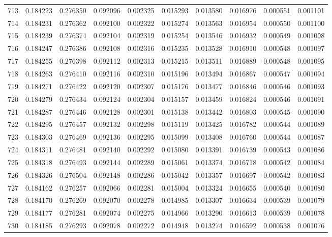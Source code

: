 \begin{tabular}{lrrrrrrrrr}
713 & 0.184223 & 0.276350 & 0.092096 & 0.002325 & 0.015293 & 0.013580 & 0.016976 & 0.000551 & 0.001101 \\
714 & 0.184231 & 0.276362 & 0.092100 & 0.002322 & 0.015274 & 0.013563 & 0.016954 & 0.000550 & 0.001100 \\
715 & 0.184239 & 0.276374 & 0.092104 & 0.002319 & 0.015254 & 0.013546 & 0.016932 & 0.000549 & 0.001098 \\
716 & 0.184247 & 0.276386 & 0.092108 & 0.002316 & 0.015235 & 0.013528 & 0.016910 & 0.000548 & 0.001097 \\
717 & 0.184255 & 0.276398 & 0.092112 & 0.002313 & 0.015215 & 0.013511 & 0.016889 & 0.000548 & 0.001095 \\
718 & 0.184263 & 0.276410 & 0.092116 & 0.002310 & 0.015196 & 0.013494 & 0.016867 & 0.000547 & 0.001094 \\
719 & 0.184271 & 0.276422 & 0.092120 & 0.002307 & 0.015176 & 0.013477 & 0.016846 & 0.000546 & 0.001093 \\
720 & 0.184279 & 0.276434 & 0.092124 & 0.002304 & 0.015157 & 0.013459 & 0.016824 & 0.000546 & 0.001091 \\
721 & 0.184287 & 0.276446 & 0.092128 & 0.002301 & 0.015138 & 0.013442 & 0.016803 & 0.000545 & 0.001090 \\
722 & 0.184295 & 0.276457 & 0.092132 & 0.002298 & 0.015119 & 0.013425 & 0.016782 & 0.000544 & 0.001089 \\
723 & 0.184303 & 0.276469 & 0.092136 & 0.002295 & 0.015099 & 0.013408 & 0.016760 & 0.000544 & 0.001087 \\
724 & 0.184311 & 0.276481 & 0.092140 & 0.002292 & 0.015080 & 0.013391 & 0.016739 & 0.000543 & 0.001086 \\
725 & 0.184318 & 0.276493 & 0.092144 & 0.002289 & 0.015061 & 0.013374 & 0.016718 & 0.000542 & 0.001084 \\
726 & 0.184326 & 0.276504 & 0.092148 & 0.002286 & 0.015042 & 0.013357 & 0.016697 & 0.000542 & 0.001083 \\
727 & 0.184162 & 0.276257 & 0.092066 & 0.002281 & 0.015004 & 0.013324 & 0.016655 & 0.000540 & 0.001080 \\
728 & 0.184170 & 0.276269 & 0.092070 & 0.002278 & 0.014985 & 0.013307 & 0.016634 & 0.000539 & 0.001079 \\
729 & 0.184177 & 0.276281 & 0.092074 & 0.002275 & 0.014966 & 0.013290 & 0.016613 & 0.000539 & 0.001078 \\
730 & 0.184185 & 0.276293 & 0.092078 & 0.002272 & 0.014948 & 0.013274 & 0.016592 & 0.000538 & 0.001076 \\

\end{tabular}
